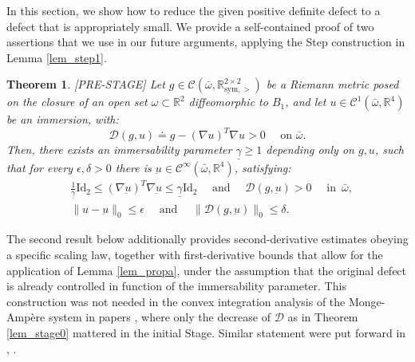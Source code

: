 \documentclass[reqno,twoside,11pt]{amsart}
\newcommand{\sym}{\mathrm{sym}}
\newcommand{\Id}{\mathrm{Id}}
\newcommand{\R}{\mathbb{R}}
\numberwithin{equation}{section}
\theoremstyle{plain}
\newtheorem{theorem}{Theorem}[section]
\theoremstyle{definition}
\begin{document}
In this section, we show how to reduce the given positive definite
defect to a defect that is appropriately small. We provide
a self-contained proof of two assertions that we use in our future
arguments, applying the Step construction in Lemma \ref{lem_step1}.

\begin{theorem}\label{lem_prestage}\textup{[PRE-STAGE]}
Let $g\in \mathcal{C}(\bar\omega, \R^{2\times 2}_{\sym, >})$
be a Riemann metric posed on the closure of an open set $\omega\subset\R^2$ diffeomorphic to $B_1$,
and let $u\in\mathcal{C}^1(\bar\omega, \R^4)$ be an immersion, with:
$$\mathcal{D}(g, u)\doteq g-(\nabla u)^T\nabla u >0 \quad\mbox{ on } \bar\omega.$$ 
Then, there exists an immersability parameter $\underline \gamma \geq 1$
depending only on $g, u$, such that for
every $\epsilon, \delta>0$ there is $\underbar
u\in\mathcal{C}^\infty(\bar\omega,\R^4)$, satisfying:
\begin{equation*}
\begin{split}
& \frac{1}{\underline \gamma} \Id_2\leq (\nabla \underbar u)^T\nabla
\underbar u \leq \underline\gamma\Id_2 \quad\mbox{ and } \quad
\mathcal{D}(g, \underbar u)>0 \quad\mbox{ in } \,\bar\omega,\\
& \|u-\underbar u\|_0\leq \epsilon \quad\mbox{ and }\quad
\|\mathcal{D}(g, \underbar u)\|_0\leq \delta.
\end{split}
\end{equation*}
\end{theorem}

\medskip

\noindent The second result below additionally provides second-derivative
estimates obeying a specific scaling law, together with
first-derivative bounds that allow for the application of Lemma
\ref{lem_propa}, under the assumption that the original defect is
already controlled in function of the immersability parameter.
This construction was not needed in the
convex integration analysis of the Monge-Amp\`ere system in papers
\cite{lewpak_MA, lew_conv, lew_improved, lew_improved2, in_lew,
  in_lew2}, where only the decrease of $\mathcal{D}$ as in Theorem \ref{lem_stage0} mattered in
the initial Stage. Similar statement were put forward in \cite[proof of
Theorem 1.1]{CHI}, \cite[Proposition 3.2]{Cao_Sze}. 
\end{document}
